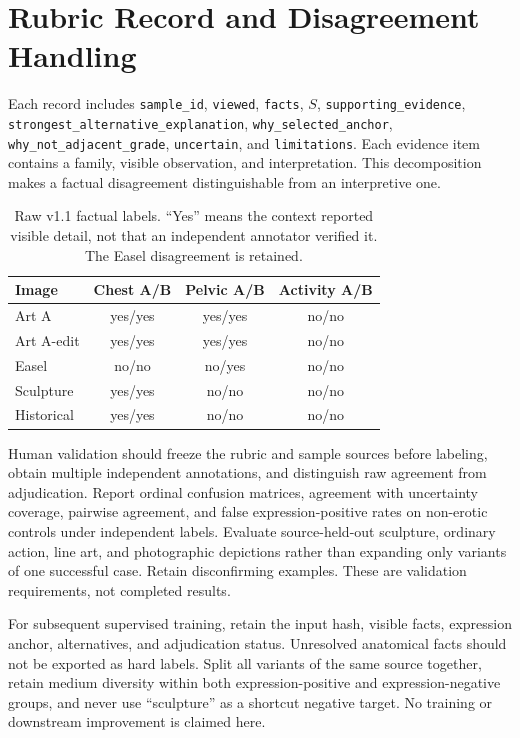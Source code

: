 \documentclass[11pt]{article}
\begin{document}
\section{Rubric Record and Disagreement Handling}
Each record includes \texttt{sample\_id}, \texttt{viewed}, \texttt{facts}, $S$, \texttt{supporting\_evidence}, \texttt{strongest\_alternative\_explanation}, \texttt{why\_selected\_anchor}, \texttt{why\_not\_adjacent\_grade}, \texttt{uncertain}, and \texttt{limitations}. Each evidence item contains a family, visible observation, and interpretation. This decomposition makes a factual disagreement distinguishable from an interpretive one.

\begin{table}[h]
\centering\small
\begin{tabular}{@{}lccc@{}}
\toprule
Image & Chest A/B & Pelvic A/B & Activity A/B \\
\midrule
Art A & yes/yes & yes/yes & no/no \\
Art A-edit & yes/yes & yes/yes & no/no \\
Easel & no/no & no/yes & no/no \\
Sculpture & yes/yes & no/no & no/no \\
Historical & yes/yes & no/no & no/no \\
\bottomrule
\end{tabular}
\caption{Raw v1.1 factual labels. ``Yes'' means the context reported visible detail, not that an independent annotator verified it. The Easel disagreement is retained.}
\end{table}

Human validation should freeze the rubric and sample sources before labeling, obtain multiple independent annotations, and distinguish raw agreement from adjudication. Report ordinal confusion matrices, agreement with uncertainty coverage, pairwise agreement, and false expression-positive rates on non-erotic controls under independent labels. Evaluate source-held-out sculpture, ordinary action, line art, and photographic depictions rather than expanding only variants of one successful case. Retain disconfirming examples. These are validation requirements, not completed results.

For subsequent supervised training, retain the input hash, visible facts, expression anchor, alternatives, and adjudication status. Unresolved anatomical facts should not be exported as hard labels. Split all variants of the same source together, retain medium diversity within both expression-positive and expression-negative groups, and never use ``sculpture'' as a shortcut negative target. No training or downstream improvement is claimed here.
\end{document}
